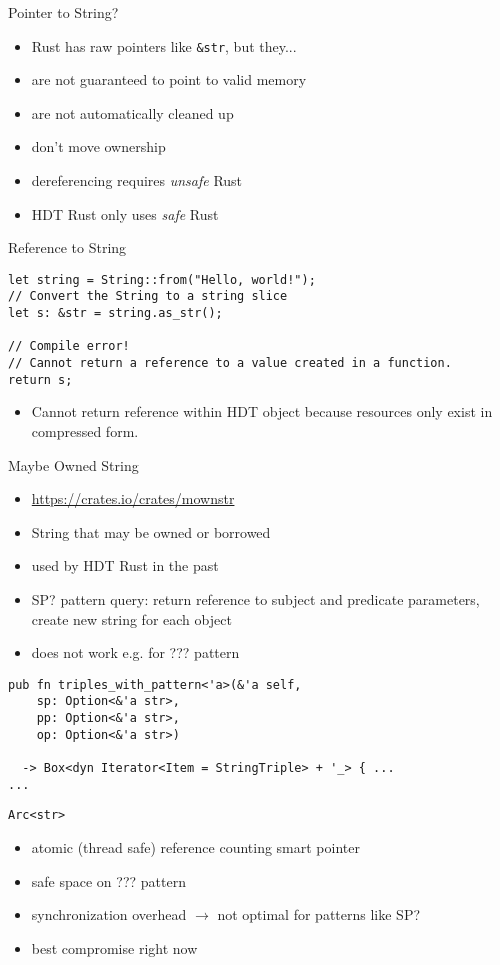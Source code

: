 \documentclass[14pt,aspectratio=169]{beamer}
\newcommand\pro{\item[$+$]}
\newcommand\con{\item[$-$]}
\begin{document}
\begin{frame}{Pointer to String?}
\begin{itemize}
\item Rust has raw pointers like \texttt{\&str}, but they...
\con are not guaranteed to point to valid memory
\con are not automatically cleaned up
\con don't move ownership
\con dereferencing requires \emph{unsafe} Rust
\item HDT Rust only uses \emph{safe} Rust
\end{itemize}
\end{frame}

\begin{frame}[fragile]{Reference to String}
\small
\begin{verbatim}
let string = String::from("Hello, world!");
// Convert the String to a string slice
let s: &str = string.as_str();

// Compile error!
// Cannot return a reference to a value created in a function.
return s;
\end{verbatim}
\begin{itemize}
\item Cannot return reference within HDT object because resources only exist in compressed form.
\end{itemize}
\end{frame}

\begin{frame}[fragile]{Maybe Owned String}
\begin{itemize}
\item \url{https://crates.io/crates/mownstr}
\item String that may be owned or borrowed
\item used by HDT Rust in the past
\pro SP? pattern query: return reference to subject and predicate parameters, create new string for each object
\con does not work e.g. for ??? pattern
\end{itemize}
\small
\begin{verbatim}
pub fn triples_with_pattern<'a>(&'a self,
    sp: Option<&'a str>,
    pp: Option<&'a str>,
    op: Option<&'a str>)

  -> Box<dyn Iterator<Item = StringTriple> + '_> { ...
...
\end{verbatim}
\end{frame}

\begin{frame}[fragile]{\texttt{Arc<str>}}
\begin{itemize}
\item atomic (thread safe) reference counting smart pointer
\pro safe space on ??? pattern
\con synchronization overhead $\rightarrow$ not optimal for patterns like SP?
\item best compromise right now
\end{itemize}
\end{frame}
\end{document}
